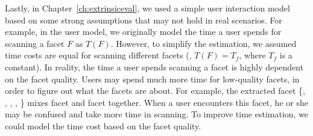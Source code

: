 Lastly, in Chapter~\ref{ch:extrinsiceval}, we used a simple user interaction model based on some strong assumptions that may not hold in real scenarios. For example, in the user model, we originally model the time a user spends for scanning a facet $F$ as $T(F)$. However, to simplify the estimation, we assumed time costs are equal for scanning different facets (\ie, $T(F)=T_f$, where $T_f$ is a constant). In reality, the time a user spends scanning a facet is highly dependent on the facet quality. Users may spend much more time for low-quality facets, in order to figure out what the facets are about. For example, the extracted facet \{, , , , \} mixes facet  and facet  together. When a user encounters this facet, he or she may be confused and take more time in scanning.
To improve time estimation, we could model the time cost based on the facet quality.







